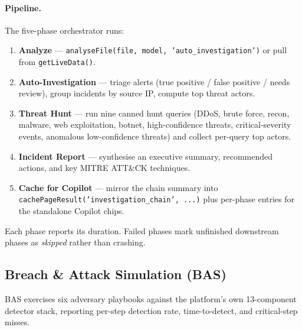 \documentclass[11pt,a4paper]{article}
\begin{document}
\paragraph{Pipeline.}  The five-phase orchestrator runs:
\begin{enumerate}[nosep]
  \item \textbf{Analyze} --- \texttt{analyseFile(file, model, 'auto\_investigation')}
        or pull from \texttt{getLiveData()}.
  \item \textbf{Auto-Investigation} --- triage alerts (true positive /
        false positive / needs review), group incidents by source IP,
        compute top threat actors.
  \item \textbf{Threat Hunt} --- run nine canned hunt queries (DDoS,
        brute force, recon, malware, web exploitation, botnet,
        high-confidence threats, critical-severity events, anomalous
        low-confidence threats) and collect per-query top actors.
  \item \textbf{Incident Report} --- synthesise an executive summary,
        recommended actions, and key MITRE ATT\&CK techniques.
  \item \textbf{Cache for Copilot} --- mirror the chain summary into
        \texttt{cachePageResult('investigation\_chain', ...)} plus
        per-phase entries for the standalone Copilot chips.
\end{enumerate}

Each phase reports its duration.  Failed phases mark unfinished
downstream phases as \emph{skipped} rather than crashing.

\subsection{Breach \& Attack Simulation (BAS)}
\label{sec:bas}

BAS exercises six adversary playbooks against the platform's own
13-component detector stack, reporting per-step detection rate,
time-to-detect, and critical-step misses.
\end{document}

